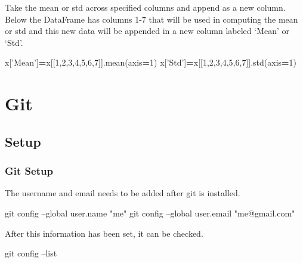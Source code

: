 \documentclass[]{book}
\newenvironment{Shaded}{\begin{snugshade}}{\end{snugshade}}
\newcommand{\DecValTok}[1]{\textcolor[rgb]{0.00,0.00,0.81}{#1}}
\newcommand{\StringTok}[1]{\textcolor[rgb]{0.31,0.60,0.02}{#1}}
\newcommand{\FunctionTok}[1]{\textcolor[rgb]{0.00,0.00,0.00}{#1}}
\newcommand{\OperatorTok}[1]{\textcolor[rgb]{0.81,0.36,0.00}{\textbf{#1}}}
\newcommand{\NormalTok}[1]{#1}
\begin{document}
Take the mean or std across specified columns and append as a new
column. Below the DataFrame has columns 1-7 that will be used in
computing the mean or std and this new data will be appended in a new
column labeled `Mean' or `Std'.

\begin{Shaded}
\begin{Highlighting}[]
\NormalTok{x[}\StringTok{'Mean'}\NormalTok{]}\OperatorTok{=}\NormalTok{x[[}\DecValTok{1}\NormalTok{,}\DecValTok{2}\NormalTok{,}\DecValTok{3}\NormalTok{,}\DecValTok{4}\NormalTok{,}\DecValTok{5}\NormalTok{,}\DecValTok{6}\NormalTok{,}\DecValTok{7}\NormalTok{]].mean(axis}\OperatorTok{=}\DecValTok{1}\NormalTok{)}
\NormalTok{x[}\StringTok{'Std'}\NormalTok{]}\OperatorTok{=}\NormalTok{x[[}\DecValTok{1}\NormalTok{,}\DecValTok{2}\NormalTok{,}\DecValTok{3}\NormalTok{,}\DecValTok{4}\NormalTok{,}\DecValTok{5}\NormalTok{,}\DecValTok{6}\NormalTok{,}\DecValTok{7}\NormalTok{]].std(axis}\OperatorTok{=}\DecValTok{1}\NormalTok{)}
\end{Highlighting}
\end{Shaded}

\chapter{Git}\label{git}

\section{Setup}\label{setup}

\subsection{Git Setup}\label{git-setup}

The username and email needs to be added after git is installed.

\begin{Shaded}
\begin{Highlighting}[]
\FunctionTok{git}\NormalTok{ config --global user.name }\StringTok{"me"}
\FunctionTok{git}\NormalTok{ config --global user.email }\StringTok{"me@gmail.com"}
\end{Highlighting}
\end{Shaded}

After this information has been set, it can be checked.

\begin{Shaded}
\begin{Highlighting}[]
\FunctionTok{git}\NormalTok{ config --list}
\end{Highlighting}
\end{Shaded}
\end{document}
